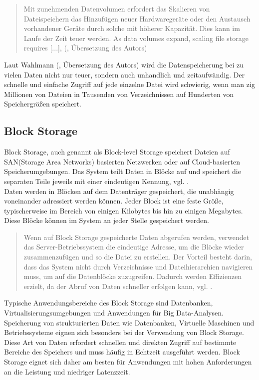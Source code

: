 \begin{quote}
	Mit zunehmenden Datenvolumen erfordert das Skalieren von Dateispeichern das Hinzufügen neuer Hardwaregeräte oder den Austausch vorhandener Geräte durch solche mit höherer Kapazität. Dies kann im Laufe der Zeit teuer werden. \glqq As data volumes expand, scaling file storage requires [...]\grqq, (\cite{nx-fileScala}, Übersetzung des Autors)
\end{quote}

Laut Wahlmann (\citeyear{nx-fileScala}, Übersetzung des Autors) wird die Datenspeicherung bei zu vielen Daten nicht nur teuer, sondern auch unhandlich und zeitaufwändig. Der schnelle und einfache Zugriff auf jede einzelne Datei wird schwierig, wenn man zig Millionen von Dateien in Tausenden von Verzeichnissen auf Hunderten von Speichergrößen speichert. 

\newpage

\subsection{Block Storage}

Block Storage, auch genannt als Block-level Storage speichert Dateien auf SAN(Storage Area Networks) basierten Netzwerken oder auf Cloud-basierten Speicherumgebungen. Das System teilt Daten in Blöcke auf und speichert die separaten Teile jeweils mit einer eindeutigen Kennung, vgl. \cite{ibm-topics}.\\

Daten werden in Blöcken auf dem Datenträger gespeichert, die unabhängig voneinander adressiert werden können. Jeder Block ist eine feste Größe, typischerweise im Bereich von einigen Kilobytes bis hin zu einigen Megabytes. Diese Blöcke können im System an jeder Stelle gespeichert werden.

\begin{quote}
	Wenn auf Block Storage gespeicherte Daten abgerufen werden, verwendet das Server-Betriebssystem die eindeutige Adresse, um die Blöcke wieder zusammenzufügen und so die Datei zu erstellen. Der Vorteil besteht darin, dass das System nicht durch Verzeichnisse und Dateihierarchien navigieren muss, um auf die Datenblöcke zuzugreifen. Dadurch werden Effizienzen erzielt, da der Abruf von Daten schneller erfolgen kann, vgl. \cite{ibm-storage}.
\end{quote}

Typische Anwendungsbereiche des Block Storage sind Datenbanken, Virtualisierungsumgebungen und Anwendungen für Big Data-Analysen. Speicherung von strukturierten Daten wie Datenbanken, Virtuelle Maschinen und Betriebssysteme eignen sich besonders bei der Verwendung von Block Storage. Diese Art von Daten erfordert schnellen und direkten Zugriff auf bestimmte Bereiche des Speichers und muss häufig in Echtzeit ausgeführt werden. Block Storage eignet sich daher am besten für Anwendungen mit hohen Anforderungen an die Leistung und niedriger Latenzzeit.

